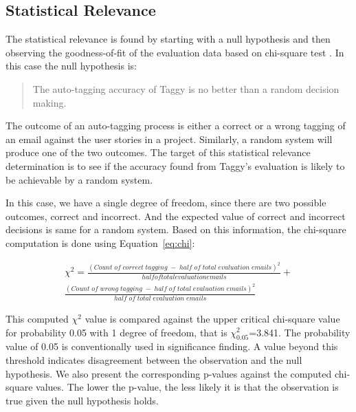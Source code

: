 \subsection{Statistical Relevance}
The statistical relevance is found by starting with a null hypothesis and then observing the goodness-of-fit of the evaluation data based on chi-square test \cite{chi_square}. In this case the null hypothesis is:

\begin{quote}
	The auto-tagging accuracy of Taggy is no better than a random decision making.
\end{quote}

The outcome of an auto-tagging process is either a correct or a wrong tagging of an email against the user stories in a project. Similarly, a random system will produce one of the two outcomes. The target of this statistical relevance determination is to see if the accuracy found from Taggy's evaluation is likely to be achievable by a random system.

In this case, we have a single degree of freedom, since there are two possible outcomes, correct and incorrect. And the expected value of correct and incorrect decisions is same for a random system. Based on this information, the chi-square computation is done using Equation~\ref{eq:chi}:

\begin{equation}
\label{eq:chi}
\begin{split}
	\chi ^ 2 = \frac {(Count \; of \; correct \; tagging \; - \; half \; of \; total \; evaluation \; emails) ^ 2} {half of total evaluation emails} +  	
\\
	\frac{(Count \; of \; wrong \; tagging \; - \; half \; of \; total \; evaluation \; emails)  ^ 2} {half \; of \; total \; evaluation \; emails}
\end{split}	
\end{equation}                                       

This computed $\chi^{2}$ value is compared against the upper critical chi-square value for probability 0.05 with 1 degree of freedom, that is $\chi^{2}_{0.05}$=3.841. The probability value of 0.05 is conventionally used in significance finding. A value beyond this threshold indicates disagreement between the observation and the null hypothesis. We also present the corresponding p-values against the computed chi-square values. The lower the p-value, the less likely it is that the observation is true given the null hypothesis holds.

